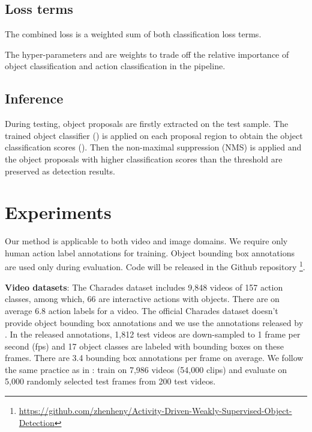 \documentclass[10pt,twocolumn,letterpaper]{article}
\begin{document}
\subsection{Loss terms}
\vspace{-0.4\baselineskip}
The combined loss is a weighted sum of both classification loss terms.
\vspace{-0.3\baselineskip}

The hyper-parameters  and  are weights to trade off the relative importance of object classification and action classification in the pipeline.
\vspace{-0.5\baselineskip}
\subsection{Inference}
\vspace{-0.5\baselineskip}
During testing, object proposals are firstly extracted on the test sample. The trained object classifier () is applied on each proposal region to obtain the object classification scores (). Then the non-maximal suppression (NMS) is applied and the object proposals with higher classification scores than the threshold are preserved as detection results.


 \vspace{-0.3\baselineskip}
\section{Experiments}
\vspace{-0.3\baselineskip}
\label{sec:evaluation}

Our method is applicable to both video and image domains. We require only human action label annotations for training. Object bounding box annotations are used only during evaluation. Code will be released in the Github repository \footnote{\url{https://github.com/zhenheny/Activity-Driven-Weakly-Supervised-Object-Detection}}.





 \textbf{Video datasets}: The Charades dataset \cite{sigurdsson2016hollywood} includes 9,848 videos of 157 action classes, among which, 66 are interactive actions with objects. There are on average 6.8 action labels for a video. The official Charades dataset doesn't provide object bounding box annotations and we use the annotations released by \cite{yuan2017temporal}.
In the released annotations, 1,812 test videos are down-sampled to 1 frame per second (fps) and 17 object classes are labeled with bounding boxes on these frames. There are 3.4 bounding box annotations per frame on average. We follow the same practice as in \cite{yuan2017temporal}: train on 7,986 videos (54,000 clips) and evaluate on 5,000 randomly selected test frames from 200 test videos.
\end{document}
